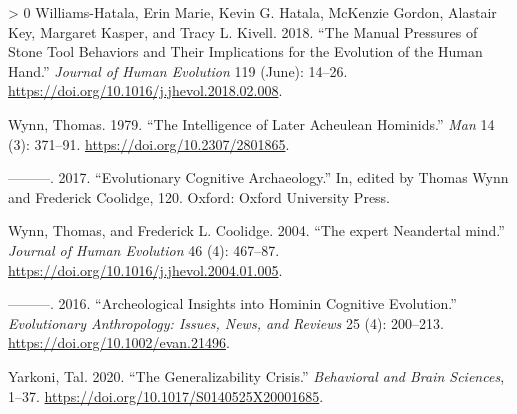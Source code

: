 \documentclass[smallextended]{svjour3}       %
\newlength{\cslhangindent}
\newenvironment{CSLReferences}[3] %
 {%
  \setlength{\parindent}{0pt}
  \ifodd #1 \everypar{\setlength{\hangindent}{\cslhangindent}}\ignorespaces\fi
  \ifnum #2 > 0
  \setlength{\parskip}{#3\baselineskip}
  \fi
 }%
 {}
\begin{document}
\begin{CSLReferences}{1}{0}
\leavevmode\hypertarget{ref-williams-hatala2018}{}%
Williams-Hatala, Erin Marie, Kevin G. Hatala, McKenzie Gordon, Alastair
Key, Margaret Kasper, and Tracy L. Kivell. 2018. {``The Manual Pressures
of Stone Tool Behaviors and Their Implications for the Evolution of the
Human Hand.''} \emph{Journal of Human Evolution} 119 (June): 14--26.
\url{https://doi.org/10.1016/j.jhevol.2018.02.008}.

\leavevmode\hypertarget{ref-wynn1979}{}%
Wynn, Thomas. 1979. {``The Intelligence of Later Acheulean Hominids.''}
\emph{Man} 14 (3): 371--91. \url{https://doi.org/10.2307/2801865}.

\leavevmode\hypertarget{ref-wynn2017}{}%
---------. 2017. {``Evolutionary Cognitive Archaeology.''} In, edited by
Thomas Wynn and Frederick Coolidge, 120. Oxford: Oxford University
Press.

\leavevmode\hypertarget{ref-wynn2004}{}%
Wynn, Thomas, and Frederick L. Coolidge. 2004. {``The expert Neandertal
mind.''} \emph{Journal of Human Evolution} 46 (4): 467--87.
\url{https://doi.org/10.1016/j.jhevol.2004.01.005}.

\leavevmode\hypertarget{ref-wynn2016}{}%
---------. 2016. {``Archeological Insights into Hominin Cognitive
Evolution.''} \emph{Evolutionary Anthropology: Issues, News, and
Reviews} 25 (4): 200--213. \url{https://doi.org/10.1002/evan.21496}.

\leavevmode\hypertarget{ref-yarkoni2020}{}%
Yarkoni, Tal. 2020. {``The Generalizability Crisis.''} \emph{Behavioral
and Brain Sciences}, 1--37.
\url{https://doi.org/10.1017/S0140525X20001685}.

\end{CSLReferences}



\end{document}
